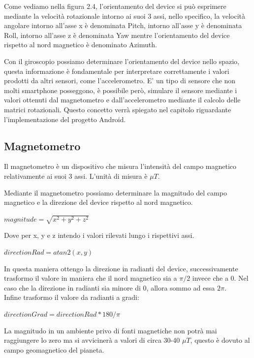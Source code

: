 \documentclass[12pt,a4paper,openright,twoside]{report}
\begin{document}
Come vediamo nella figura 2.4, l'orientamento del device si può esprimere mediante la velocità rotazionale intorno ai suoi 3 assi, nello specifico, la velocità angolare intorno all'asse x è denominata Pitch, intorno all'asse y è denominata Roll, intorno all'asse z è denominata Yaw mentre l'orientamento del device rispetto al nord magnetico è denominato Azimuth.


Con il giroscopio possiamo determinare l'orientamento del device nello spazio, questa informazione è fondamentale per interpretare correttamente i valori prodotti da altri sensori, come l'accelerometro.
E' un tipo di sensore che non molti smartphone posseggono, è possibile però, simulare il sensore mediante i valori ottenuti dal magnetometro e dall'accelerometro mediante il calcolo delle matrici rotazionali. Questo concetto verrà spiegato nel capitolo riguardante l'implementazione del progetto Android.
\subsection{Magnetometro}
Il magnetometro è un dispositivo che misura l'intensità del campo magnetico relativamente ai suoi 3 assi. L'unità di misura è $\mu T$. 


Mediante il magnetometro possiamo determinare la magnitudo del campo magnetico e la direzione del device rispetto al nord magnetico.

\begin{center}
$ magnitude = \sqrt{ x^2 + y^2 + z^2}$
\end{center}
Dove per x, y e z intendo i valori rilevati lungo i rispettivi assi.


\begin{center}
$directionRad = atan2(x,y)$
\end{center}


In questa maniera ottengo la direzione in radianti del device, successivamente trasformo il valore in maniera che il nord magnetico sia a $ \pi / 2$ invece che a 0. Nel caso che la direzione in radianti sia minore di 0, allora sommo ad essa  $2\pi $. \\
Infine trasformo il valore da radianti a gradi:

\begin{center}
$directionGrad = directionRad * 180/ \pi$
\end{center}

La magnitudo in un ambiente privo di fonti magnetiche non potrà mai raggiungere lo zero ma si avvicinerà a valori di circa 30-40 $\mu T$, questo è dovuto al campo geomagnetico del pianeta.
\end{document}
